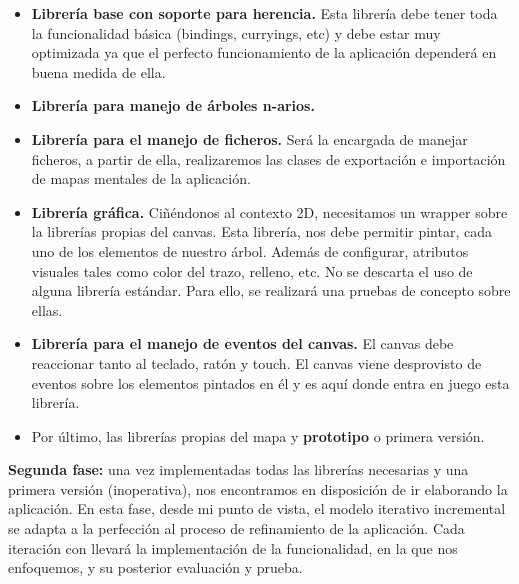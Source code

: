 \begin{itemize}
\item \textbf{Librería base con soporte para herencia.} Esta librería debe tener toda la funcionalidad básica (bindings, curryings, etc) y debe estar muy optimizada ya que el perfecto funcionamiento de la aplicación dependerá en buena medida de ella.

\item \textbf{Librería para manejo de árboles n-arios.} 

\item \textbf{Librería para el manejo de ficheros.} Será la encargada de manejar ficheros, a partir de ella, realizaremos las clases de exportación e importación de mapas mentales de la aplicación. 

\item \textbf{Librería gráfica.} Ciñéndonos al contexto 2D, necesitamos un wrapper sobre la librerías propias del canvas. Esta librería, nos debe permitir pintar, cada uno de los elementos de nuestro árbol. Además de configurar, atributos visuales tales como color del trazo, relleno, etc. No se descarta el uso de alguna librería estándar. Para ello, se realizará una pruebas de concepto sobre ellas.

\item \textbf{Librería para el manejo de eventos del canvas.} El canvas debe reaccionar tanto al teclado, ratón y touch. El canvas viene desprovisto de eventos sobre los elementos pintados en él y es aquí donde entra en juego esta librería. 

\item Por último, las librerías propias del mapa y \textbf{prototipo} o primera versión. 
\end{itemize}

\textbf{Segunda fase:} una vez implementadas todas las librerías necesarias y una primera versión (inoperativa), nos encontramos en disposición de ir elaborando la aplicación. En esta fase, desde mi punto de vista, el modelo iterativo incremental se adapta a la perfección al proceso de refinamiento de la aplicación. Cada iteración con llevará la implementación de la funcionalidad, en la que nos enfoquemos, y su posterior evaluación y prueba.
